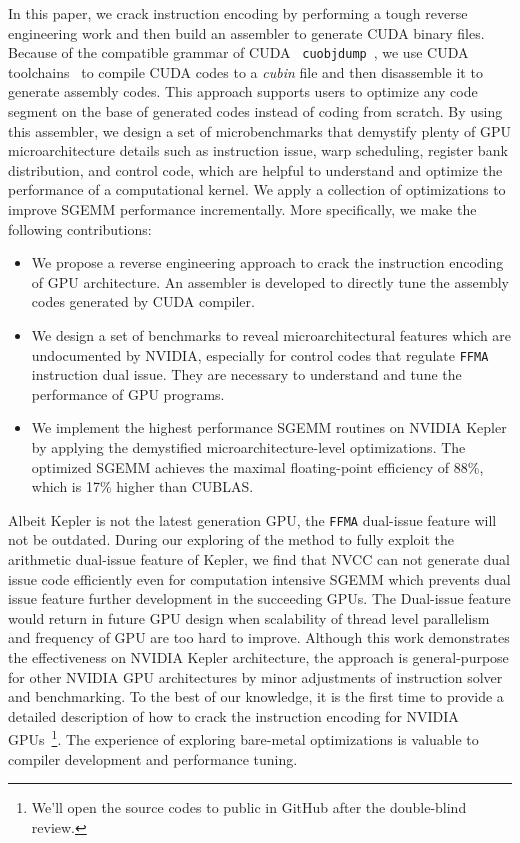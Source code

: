 In this paper, we crack instruction encoding by performing a tough reverse engineering work and then build an 
assembler to generate CUDA binary files. Because of the compatible grammar of CUDA {\tt 
cuobjdump}~\cite{cubin2015util}, we use CUDA toolchains~\cite{nvcc} to compile CUDA codes to a {\em cubin} file and 
then disassemble it to generate assembly codes. This approach supports users to optimize any code segment on the base 
of generated codes instead of coding from scratch. By using this assembler, we design a set of microbenchmarks that 
demystify plenty of GPU microarchitecture details such as instruction issue, warp scheduling, register bank distribution, 
and control code, which are helpful to understand and optimize the performance of a computational kernel. We apply a collection of 
optimizations to improve SGEMM performance incrementally. More specifically, we make the following contributions:
\begin{itemize}
\item We propose a reverse engineering approach to crack the instruction encoding of GPU architecture.
An assembler is developed to directly tune the assembly codes generated by CUDA compiler.
\item We design a set of benchmarks to reveal microarchitectural features which are undocumented by NVIDIA, 
especially for control codes that regulate {\tt FFMA} instruction dual issue.
They are necessary to understand and tune the performance of GPU programs.
\item We implement the highest performance SGEMM routines on NVIDIA Kepler by applying the demystified 
microarchitecture-level optimizations. The optimized SGEMM achieves the maximal floating-point efficiency of 88\%, 
which is 17\% higher than CUBLAS.
\end{itemize}

Albeit Kepler is not the latest generation GPU, the {\tt FFMA} dual-issue feature will not be
outdated. During our exploring of the method to fully exploit the arithmetic
dual-issue feature of Kepler, we find that NVCC can not generate dual issue code efficiently even for computation
intensive SGEMM which prevents dual issue feature further development in the succeeding GPUs. The Dual-issue feature would return in future
GPU design when scalability of thread level parallelism and frequency of GPU are too hard to improve.
Although this work demonstrates the effectiveness on NVIDIA Kepler architecture, the approach is general-purpose for 
other NVIDIA GPU architectures by minor adjustments of instruction solver and benchmarking. To the best of our 
knowledge, it is the first time to provide a detailed description of how to crack the instruction encoding for NVIDIA 
GPUs~\footnote{We'll open the source codes to public in GitHub after the double-blind review.}. The experience of 
exploring bare-metal optimizations is valuable to compiler development and performance tuning.

